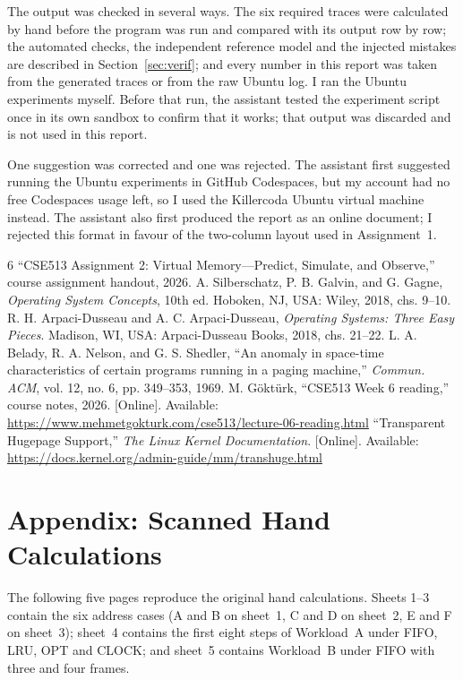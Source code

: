 \documentclass[conference,a4paper]{IEEEtran}
\begin{document}
The output was checked in several ways. The six required traces were calculated by hand before the program was run and compared with its output row by row; the automated checks, the independent reference model and the injected mistakes are described in Section~\ref{sec:verif}; and every number in this report was taken from the generated traces or from the raw Ubuntu log. I ran the Ubuntu experiments myself. Before that run, the assistant tested the experiment script once in its own sandbox to confirm that it works; that output was discarded and is not used in this report.

One suggestion was corrected and one was rejected. The assistant first suggested running the Ubuntu experiments in GitHub Codespaces, but my account had no free Codespaces usage left, so I used the Killercoda Ubuntu virtual machine instead. The assistant also first produced the report as an online document; I rejected this format in favour of the two-column layout used in Assignment~1.

\begin{thebibliography}{6}
 ``CSE513 Assignment 2: Virtual Memory---Predict, Simulate, and Observe,'' course assignment handout, 2026.
 A. Silberschatz, P. B. Galvin, and G. Gagne, \emph{Operating System Concepts}, 10th ed. Hoboken, NJ, USA: Wiley, 2018, chs. 9--10.
 R. H. Arpaci-Dusseau and A. C. Arpaci-Dusseau, \emph{Operating Systems: Three Easy Pieces}. Madison, WI, USA: Arpaci-Dusseau Books, 2018, chs. 21--22.
 L. A. Belady, R. A. Nelson, and G. S. Shedler, ``An anomaly in space-time characteristics of certain programs running in a paging machine,'' \emph{Commun. ACM}, vol. 12, no. 6, pp. 349--353, 1969.
 M. Göktürk, ``CSE513 Week 6 reading,'' course notes, 2026. [Online]. Available: \url{https://www.mehmetgokturk.com/cse513/lecture-06-reading.html}
 ``Transparent Hugepage Support,'' \emph{The Linux Kernel Documentation}. [Online]. Available: \url{https://docs.kernel.org/admin-guide/mm/transhuge.html}
\end{thebibliography}

\clearpage
\onecolumn
\section*{Appendix: Scanned Hand Calculations}
The following five pages reproduce the original hand calculations. Sheets 1--3 contain the six address cases (A and B on sheet~1, C and D on sheet~2, E and F on sheet~3); sheet~4 contains the first eight steps of Workload~A under FIFO, LRU, OPT and CLOCK; and sheet~5 contains Workload~B under FIFO with three and four frames.
\end{document}
